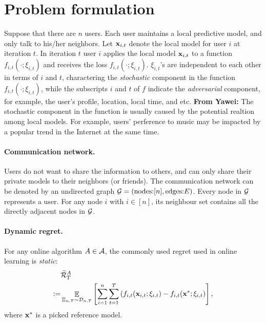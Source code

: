 \documentclass{article}
\def\rc{\color {red}}
\begin{document}
\section{Problem formulation}

Suppose that there are $n$ users. Each user maintains a local predictive model, and only talk to his/her neighbors. Let ${\bf x}_{i, t}$ denote the local model for user $i$ at iteration $t$. In iteration $t$ user $i$ applies the local model ${\bf x}_{i,t}$ to a function $f_{i,t}(\cdot; \xi_{i,t})$ and receives the loss $f_{i,t}(\cdot; \xi_{i,t})$. $\xi_{i,t}$'s are independent to each other in terms of $i$ and $t$, charactering the \emph{stochastic} component in the function $f_{i,t}(\cdot; \xi_{i,t})$, while the subscripts $i$ and $t$ of $f$ indicate the \emph{adversarial} component, for example, the user's profile, location, local time, and etc. {\rc \textbf{From Yawei:} The stochastic component in the function is usually caused by the potential realtion among local models. For example, users' perference to music may be impacted by a popular trend in the Internet at the same time. } 






\paragraph{Communication network.} Users do not want to share the information to others, and can only share their private models to their neighbors (or friends). The communication network can be denoted by an undirected graph ${\mathcal{G}}=(\text{nodes:} [n], \text{edges:} E)$. Every node in ${\mathcal{G}}$ represents a user. For any node $i$ with $i\in[n]$, its neighbour set contains all the directly adjacent nodes in ${\mathcal{G}}$. 

\paragraph{Dynamic regret.} For any online algorithm $A\in{\mathcal{A}}$, the commonly used regret used in online learning is \emph{static}:
\begin{align}
\label{equa_definition_static_regret}
& \widetilde{{\mathcal{R}}}_T^{A} \\ \nonumber 
:= & \mathop{\mathbb{E}}_{ \Xi_{n,T} \sim \mathcal{D}_{n,T} }  \left[\sum_{i=1}^n\sum_{t=1}^T \left( f_{i,t}({\bf x}_{i,t};\xi_{i,t}) - f_{i,t}({\bf x}^\ast;\xi_{i,t} \right) \right],
\end{align} where ${\bf x}^\ast$ is a picked reference model.
\end{document}
